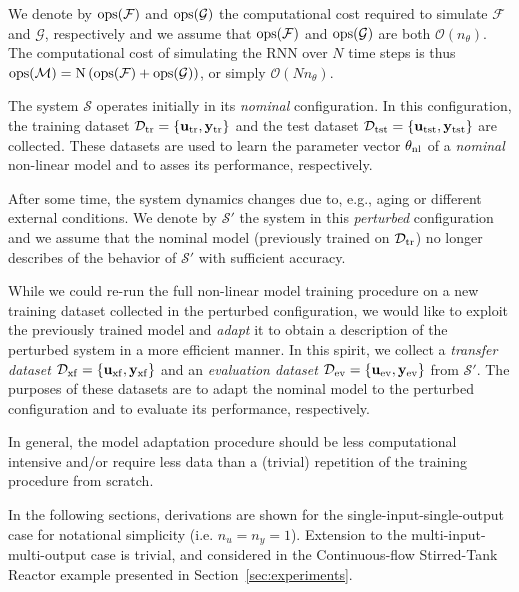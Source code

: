 \documentclass{article}
\newcommand{\nsamp}{{N}}
\newcommand{\npar}{{n_\theta}}
\newcommand{\M}{\mathcal{M}}
\newcommand{\F}{\mathcal{F}}
\newcommand{\G}{\mathcal{G}}
\newcommand{\D}{\mathcal{D}}
\newcommand{\sys}{{\mathcal{S}}}
\newcommand{\tr}{{\rm{tr}}}
\newcommand{\tst}{{\rm{tst}}}
\newcommand{\transf}{{\rm{xf}}}
\newcommand{\eval}{{\rm{ev}}}
\newcommand{\ops}{\rm{ops}}
\newcommand{\nominal}{{\rm{nl}}}
\newcommand{\tvec}[1]{{\mathbf{#1}}}
\begin{document}
We denote by $\ops(\F)$ and $\ops(\G)$ the computational cost required to simulate $\F$ and $\G$, respectively and we assume that $\ops(\F)$ and $\ops(\G)$ are both $\mathcal{O}(\npar)$.
The computational cost of simulating the RNN over $\nsamp$ time
steps is thus $\ops(\M) = \nsamp \left(\ops(\F) + \ops(\G)\right)$, 
or simply $\mathcal{O}(\nsamp \npar)$.



The system  $\sys$ operates initially in its \emph{nominal} configuration. In this configuration, the training dataset $\D_\tr = \{\tvec{u}_\tr, \tvec{y}_\tr\}$ and the test dataset 
$\D_\tst = \{\tvec{u}_\tst, \tvec{y}_\tst\}$ are collected. These datasets are used to 
learn the parameter vector $\theta_\nominal$ of a \emph{nominal} non-linear model 
and to asses its performance, respectively.

After some time, the system dynamics changes due to, e.g., aging or different external conditions.
We denote by $\sys'$ the system in this \emph{perturbed} configuration and we assume that the nominal model
(previously trained on $\D_\tr$) no longer describes of the behavior of $\sys'$ with sufficient accuracy.

While we could re-run the full non-linear model training procedure on a new training dataset collected in the perturbed configuration, we would like to exploit the previously trained model and \emph{adapt} it to obtain a description of the perturbed system in a more efficient manner.  In this spirit, we collect a \emph{transfer dataset} $\D_\transf = \{\tvec{u}_\transf, \tvec{y}_\transf\}$ and an \emph{evaluation dataset} $\D_\eval = \{\tvec{u}_\eval, \tvec{y}_\eval\}$ from $\sys'$. The purposes of these datasets are to adapt the nominal model to the perturbed configuration and to evaluate its performance, respectively.

In general, the model adaptation procedure should be less computational intensive and/or require less data than a (trivial) repetition of the training procedure from scratch.

In the following sections, derivations are shown for the single-input-single-output case for notational simplicity (i.e. $n_u = n_{y} = 1$). Extension to the multi-input-multi-output case is trivial, and considered in the Continuous-flow Stirred-Tank Reactor example presented in Section~\ref{sec:experiments}. 
\end{document}
